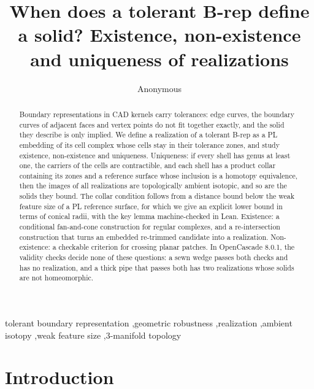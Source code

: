 \documentclass[preprint,12pt]{elsarticle}
\theoremstyle{definition}
\theoremstyle{remark}
\begin{document}
\begin{frontmatter}

\title{When does a tolerant B-rep define a solid? Existence, non-existence and uniqueness of realizations}

\author{Anonymous}

\begin{abstract}
Boundary representations in CAD kernels carry tolerances: edge curves, the boundary curves of adjacent faces and vertex
points do not fit together exactly, and the solid they describe is only implied. We define a realization of a tolerant
B-rep as a PL embedding of its cell complex whose cells stay in their tolerance zones, and study existence,
non-existence and uniqueness. Uniqueness: if every shell has genus at least one, the carriers of the cells are
contractible, and each shell has a product collar containing its zones and a reference surface whose inclusion is a
homotopy equivalence, then the images of all realizations are topologically ambient isotopic, and so are the solids
they bound. The collar condition follows from a distance bound below the weak feature size of a PL reference surface,
for which we give an explicit lower bound in terms of conical radii, with the key lemma machine-checked in Lean.
Existence: a conditional fan-and-cone construction for regular complexes, and a re-intersection construction that
turns an embedded re-trimmed candidate into a realization. Non-existence: a checkable criterion for crossing planar
patches. In OpenCascade 8.0.1, the validity checks decide none of these questions: a sewn wedge passes both checks and
has no realization, and a thick pipe that passes both has two realizations whose solids are not homeomorphic.
\end{abstract}

\begin{keyword}
tolerant boundary representation \sep geometric robustness \sep realization \sep ambient isotopy \sep weak feature
size \sep 3-manifold topology
\end{keyword}

\end{frontmatter}

\section{Introduction}\label{sec:intro}
\end{document}
